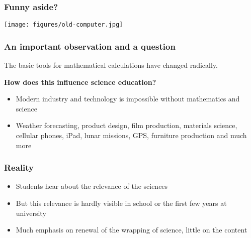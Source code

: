 \documentclass{beamer}
\begin{document}
\begin{frame}
\frametitle{Funny aside?}

\begin{block}{}


\centerline{\texttt{[image: figures/old-computer.jpg]}}



\end{block}
\end{frame}

\begin{frame}
\frametitle{An important observation and a  question}

\begin{block}{}

The basic tools for mathematical calculations have changed radically.

\textbf{How does this influence science education?}

\begin{itemize}
\item Modern industry and technology is impossible without mathematics and science

\item Weather forecasting, product design, film production, materials science, cellular phones, iPad, lunar missions, GPS, furniture production and much more
\end{itemize}

\noindent
\end{block}
\end{frame}

\begin{frame}
\frametitle{Reality}

\begin{block}{}

\begin{itemize}
\item Students hear about the relevance of the sciences

\item But this relevance is hardly visible in school or the first few years at university

\item Much emphasis on renewal of the wrapping of science, little on the content
\end{itemize}

\noindent
\end{block}
\end{frame}
\end{document}
